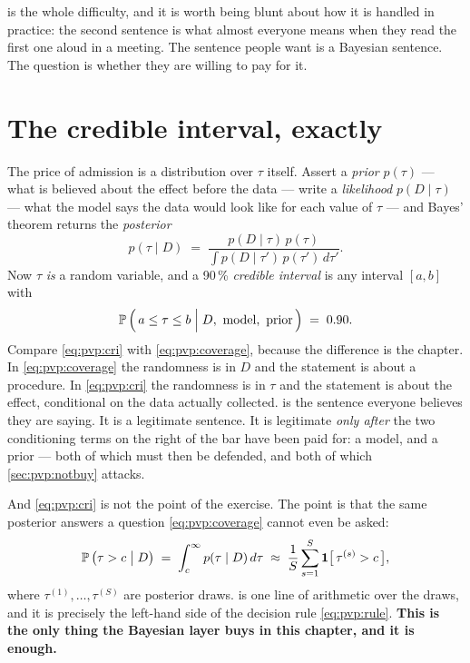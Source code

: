  is the whole difficulty, and it is worth being blunt about how it is handled
in practice: the second sentence is what almost everyone means when they read the first one
aloud in a meeting. The sentence people want is a Bayesian sentence. The question is whether they
are willing to pay for it.

\section{The credible interval, exactly}
\label{sec:pvp:cri}

The price of admission is a distribution over $\tau$ itself. Assert a \emph{prior}
$p(\tau)$ --- what is believed about the effect before the data --- write a \emph{likelihood}
$p(D \mid \tau)$ --- what the model says the data would look like for each value of $\tau$ ---
and Bayes' theorem returns the \emph{posterior}
%
\begin{equation}
  p(\tau \mid D) \;=\; \frac{p(D \mid \tau)\, p(\tau)}{\int p(D \mid \tau')\, p(\tau')\, d\tau'} .
  \label{eq:pvp:bayes}
\end{equation}
%
Now $\tau$ \emph{is} a random variable, and a 90\,\% \emph{credible interval} is any interval
$[a, b]$ with
%
\begin{equation}
  \operatorname{\mathbb{P}}\Big(\,a \le \tau \le b \;\Big|\; D,\ \text{model},\ \text{prior}\,\Big) \;=\; 0.90 .
  \label{eq:pvp:cri}
\end{equation}
%
Compare \cref{eq:pvp:cri} with \cref{eq:pvp:coverage}, because the difference is the chapter. In
\cref{eq:pvp:coverage} the randomness is in $D$ and the statement is about a procedure. In
\cref{eq:pvp:cri} the randomness is in $\tau$ and the statement is about the effect, conditional
on the data actually collected.  is the sentence everyone believes they are
saying. It is a legitimate sentence. It is legitimate \emph{only after} the two conditioning
terms on the right of the bar have been paid for: a model, and a prior --- both of which must
then be defended, and both of which \cref{sec:pvp:notbuy} attacks.

And \cref{eq:pvp:cri} is not the point of the exercise. The point is that the same posterior
answers a question \cref{eq:pvp:coverage} cannot even be asked:
%
\begin{equation}
  \operatorname{\mathbb{P}}\big(\tau > c \;\big|\; D\big) \;=\; \int_{c}^{\infty} p(\tau \mid D)\, d\tau
  \;\approx\; \frac{1}{S}\sum_{s=1}^{S} \mathbf 1\big[\,\tau^{(s)} > c\,\big],
  \label{eq:pvp:pgt}
\end{equation}
%
where $\tau^{(1)}, \dots, \tau^{(S)}$ are posterior draws.  is one line of
arithmetic over the draws, and it is precisely the left-hand side of the decision rule
\cref{eq:pvp:rule}. \textbf{This is the only thing the Bayesian layer buys in this chapter, and
it is enough.}

